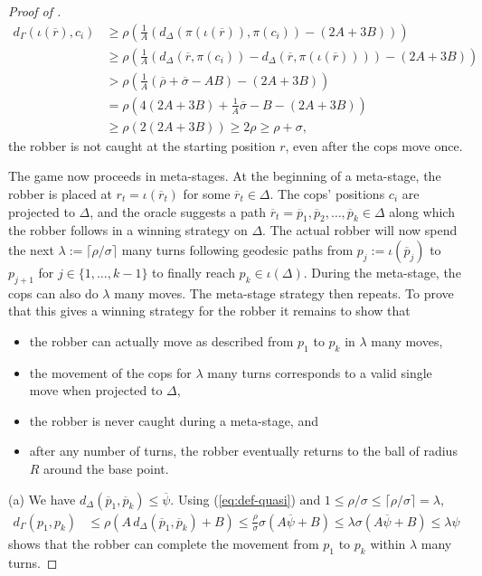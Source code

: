 \documentclass{amsart}
\theoremstyle{definition}
\theoremstyle{remark}
\theoremstyle{remark}
\theoremstyle{definition}
\renewcommand{\leq}{\leqslant}
\renewcommand{\geq}{\geqslant}
\begin{document}
\begin{proof}[Proof of ]
    \begin{align*}
        d_{\Gamma}(\iota(\overline{r}),c_i) & \geq \rho \left( \frac{1}{A} \left( d_\Delta (\pi(\iota(\overline{r})), \pi(c_i) )- (2A + 3B) \right)\right) \\
        &\geq \rho \left( \frac{1}{A} ( d_\Delta(\overline{r}, \pi(c_i)) - d_\Delta(\overline{r} , \pi(\iota(\overline{r})) ) )-(2A+ 3B) \right) \\
        &> \rho \left( \frac{1}{A} (\overline{\rho} + \overline{\sigma} - AB ) -(2A + 3B) \right) \\
        &=  \rho\left( 4(2A + 3B) + \frac{1}{A}\overline{\sigma} - B - (2A + 3B) \right) \\
        & \geq \rho(2(2A + 3B)) \geq 2\rho \geq \rho + \sigma ,
    \end{align*}
    the robber is not caught at the starting position $r$, even after the cops move once.

    The game now proceeds in meta-stages. At the beginning of a meta-stage, the robber is placed at $r_t = \iota(\overline{r}_t)$ for some $\overline{r}_t \in \Delta$. The cops' positions $c_i$ are projected to $\Delta$, and the oracle suggests a path $ \overline{r}_t = \overline{p}_1 , \overline{p}_2, \ldots , \overline{p}_k \in \Delta$ along which the robber follows in a winning strategy on $\Delta$. The actual robber will now spend the next $\lambda := \lceil \rho/\sigma \rceil $ many turns following geodesic paths from $p_j := \iota(\overline{p}_j)$ to $p_{j+1}$ for $j \in \{ 1, \ldots , k-1\}$ to finally reach $p_k \in \iota(\Delta)$. During the meta-stage, the cops can also do $\lambda$ many moves. The meta-stage strategy then repeats. To prove that this gives a winning strategy for the robber it remains to show that
    \begin{itemize}
        \item [(a)] the robber can actually move as described from $p_1$ to $p_k$ in $\lambda$ many moves,
        \item [(b)] the movement of the cops for $\lambda$ many turns corresponds to a valid single move when projected to $\Delta$,
        \item [(c)] the robber is never caught during a meta-stage, and
        \item [(d)] after any number of turns, the robber eventually returns to the ball of radius $R$ around the base point.
    \end{itemize}

    (a) We have $d_\Delta(\overline{p}_1, \overline{p}_k) \leq \overline{\psi}$. Using (\ref{eq:def-quasi}) and $1 \leq \rho/\sigma \leq \lceil \rho / \sigma \rceil = \lambda$,
\begin{align*}
    d_{\Gamma}(p_1, p_k) & \leq \rho\left(A \, d_\Delta(\overline{p}_1, \overline{p}_k) + B \right)
    \leq \frac{\rho}{\sigma} \sigma \left(A \overline{\psi} + B\right)
    \leq \lambda \sigma (A \overline{\psi} + B) \leq \lambda \psi
\end{align*}
shows that the robber can complete the movement from $p_1$ to $p_k$ within $\lambda$ many turns.



\end{proof}
\end{document}
